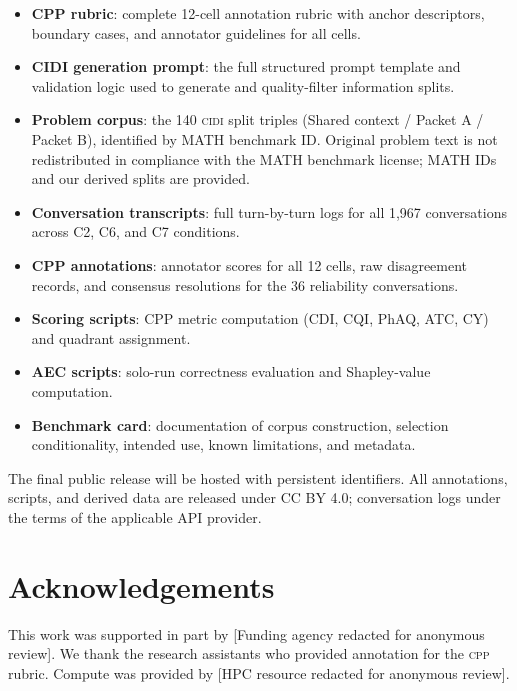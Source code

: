 \documentclass{article}
\newcommand{\CPP}{\textsc{cpp}}
\newcommand{\CIDI}{\textsc{cidi}}
\begin{document}
\begin{itemize}
  \item \textbf{CPP rubric}: complete 12-cell annotation rubric with
  anchor descriptors, boundary cases, and annotator guidelines for all
  cells.
  \item \textbf{CIDI generation prompt}: the full structured prompt
  template and validation logic used to generate and quality-filter
  information splits.
  \item \textbf{Problem corpus}: the 140 \CIDI{} split triples (Shared
  context / Packet A / Packet B), identified by MATH benchmark ID.
  Original problem text is not redistributed in compliance with the
  MATH benchmark license; MATH IDs and our derived splits are
  provided.
  \item \textbf{Conversation transcripts}: full turn-by-turn logs for
  all 1,967 conversations across C2, C6, and C7 conditions.
  \item \textbf{CPP annotations}: annotator scores for all 12 cells,
  raw disagreement records, and consensus resolutions for the 36
  reliability conversations.
  \item \textbf{Scoring scripts}: CPP metric computation (CDI, CQI,
  PhAQ, ATC, CY) and quadrant assignment.
  \item \textbf{AEC scripts}: solo-run correctness evaluation and
  Shapley-value computation.
  \item \textbf{Benchmark card}: documentation of corpus construction,
  selection conditionality, intended use, known limitations, and
  metadata.
\end{itemize}

The final public release will be hosted with persistent identifiers.
All annotations, scripts, and derived data are released under CC BY
4.0; conversation logs under the terms of the applicable API provider.

\section*{Acknowledgements}
This work was supported in part by [Funding agency redacted for
anonymous review]. We thank the research assistants who provided
annotation for the \CPP{} rubric. Compute was provided by [HPC
resource redacted for anonymous review].



\appendix
\end{document}
